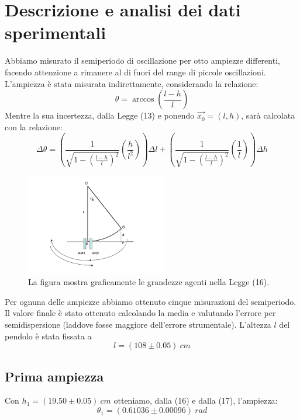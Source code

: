 \documentclass[11pt]{article}
\begin{document}
\section{Descrizione e analisi dei dati sperimentali}
Abbiamo misurato il semiperiodo di oscillazione per otto ampiezze differenti, facendo attenzione a rimanere al di fuori del range di piccole oscillazioni. L'ampiezza è stata misurata indirettamente, considerando la relazione:
\begin{equation}
    \theta = \arccos\left(\frac{l-h}{l}\right)
\end{equation}
Mentre la sua incertezza, dalla Legge (13) e ponendo $\vec{x_0}=(l,h)$, sarà calcolata con la relazione:
\begin{equation}
    \Delta \theta=\left(\frac{1}{\sqrt{1-\left(\frac{l-h}{l}\right)^2}}\left(\frac{h}{l^2}\right)\right)\Delta l + \left(\frac{1}{\sqrt{1-\left(\frac{l-h}{l}\right)^2}}\left(\frac{1}{l}\right)\right)\Delta h
\end{equation}
\begin{figure}[H]
  \centering
  \includegraphics[width=0.55\textwidth]{pendolo1.png}
  \caption{La figura mostra graficamente le grandezze agenti nella Legge (16).}
\end{figure}
Per ognuna delle ampiezze abbiamo ottenuto cinque misurazioni del semiperiodo. Il valore finale è stato ottenuto calcolando la media e valutando l'errore per semidispersione (laddove fosse maggiore dell'errore strumentale). L'altezza $l$ del pendolo è stata fissata a
\begin{equation}
    l=(108\pm 0.05)\ cm
\end{equation}

\subsection{Prima ampiezza}
Con $h_1 = (19.50\pm 0.05)\ cm$ otteniamo, dalla (16) e dalla (17), l'ampiezza:
\begin{equation}
    \theta_1 = (0.61036\pm 0.00096)\ rad
\end{equation}
\end{document}
